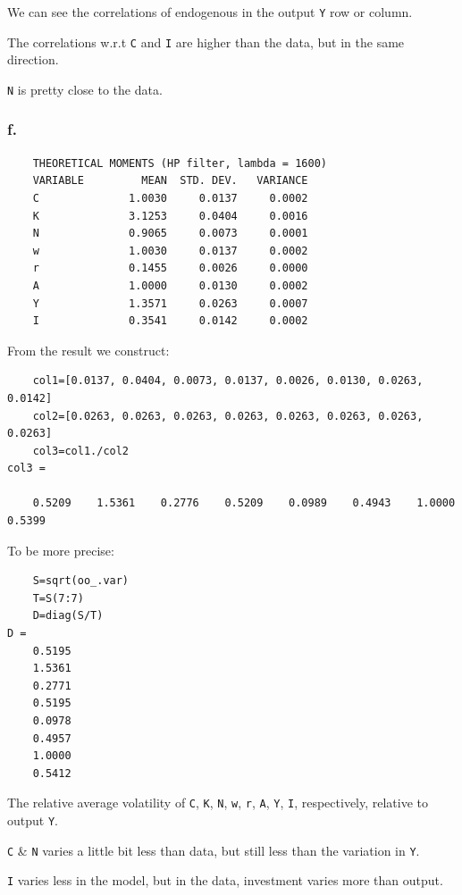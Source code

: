 \documentclass{article}
\begin{document}
We can see the correlations of endogenous in the output \texttt{Y} row or column.

The correlations w.r.t \texttt{C} and \texttt{I} are higher than the data, but in the same direction.

\texttt{N} is pretty close to the data.

\subsubsection*{\textrm{f.}}

\begin{lstlisting}
    THEORETICAL MOMENTS (HP filter, lambda = 1600)
    VARIABLE         MEAN  STD. DEV.   VARIANCE
    C              1.0030     0.0137     0.0002
    K              3.1253     0.0404     0.0016
    N              0.9065     0.0073     0.0001
    w              1.0030     0.0137     0.0002
    r              0.1455     0.0026     0.0000
    A              1.0000     0.0130     0.0002
    Y              1.3571     0.0263     0.0007
    I              0.3541     0.0142     0.0002
\end{lstlisting}

From the result we construct:

\begin{lstlisting}
    col1=[0.0137, 0.0404, 0.0073, 0.0137, 0.0026, 0.0130, 0.0263, 0.0142]
    col2=[0.0263, 0.0263, 0.0263, 0.0263, 0.0263, 0.0263, 0.0263, 0.0263]
    col3=col1./col2
col3 =

    0.5209    1.5361    0.2776    0.5209    0.0989    0.4943    1.0000    0.5399
\end{lstlisting}

To be more precise:

\begin{lstlisting}
    S=sqrt(oo_.var)
    T=S(7:7)
    D=diag(S/T)
D = 
    0.5195
    1.5361
    0.2771
    0.5195
    0.0978
    0.4957
    1.0000
    0.5412
\end{lstlisting}

The relative average volatility of \texttt{C}, \texttt{K}, \texttt{N}, \texttt{w}, \texttt{r}, \texttt{A}, \texttt{Y}, \texttt{I}, respectively, relative to output \texttt{Y}.

\texttt{C} \& \texttt{N} varies a little bit less than data, but still less than the variation in \texttt{Y}.

\texttt{I} varies less in the model, but in the data, investment varies more than output.
\end{document}

